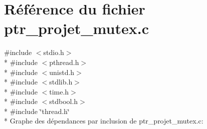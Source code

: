 \section{Référence du fichier ptr\+\_\+projet\+\_\+mutex.\+c}
\label{ptr__projet__mutex_8c}
{\ttfamily \#include $<$stdio.\+h$>$}\\*
{\ttfamily \#include $<$pthread.\+h$>$}\\*
{\ttfamily \#include $<$unistd.\+h$>$}\\*
{\ttfamily \#include $<$stdlib.\+h$>$}\\*
{\ttfamily \#include $<$time.\+h$>$}\\*
{\ttfamily \#include $<$stdbool.\+h$>$}\\*
{\ttfamily \#include \char`\"{}thread.\+h\char`\"{}}\\*
Graphe des dépendances par inclusion de ptr\+\_\+projet\+\_\+mutex.\+c\+:
